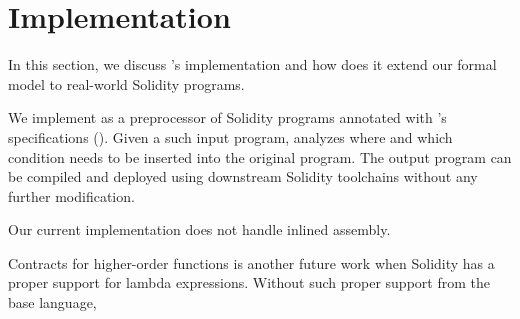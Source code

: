 \section{Implementation}

In this section, we discuss \lang's implementation and how does it extend our
formal model to real-world Solidity programs.

We implement \lang as a preprocessor of Solidity programs annotated with
\lang's specifications (). Given a such input program, \lang analyzes where and
which condition needs to be inserted into the original program.
The output program can be compiled and deployed using downstream Solidity
toolchains without any further modification.

Our current implementation does not handle inlined assembly. 

Contracts for higher-order functions is another future work when Solidity has a
proper support for lambda expressions. Without such proper support from the base language,

